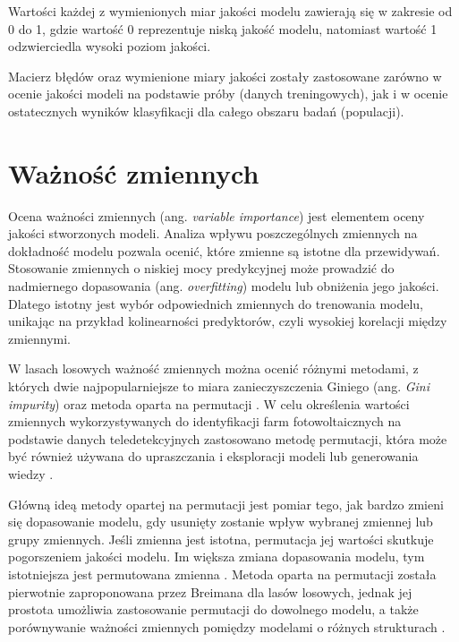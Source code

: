 \documentclass{amuthesis}
\begin{document}
Wartości każdej z wymienionych miar jakości modelu zawierają się w
zakresie od 0 do 1, gdzie wartość 0 reprezentuje niską jakość modelu,
natomiast wartość 1 odzwierciedla wysoki poziom jakości.

Macierz błędów oraz wymienione miary jakości zostały zastosowane zarówno
w ocenie jakości modeli na podstawie próby (danych treningowych), jak i
w ocenie ostatecznych wyników klasyfikacji dla całego obszaru badań
(populacji).

\hypertarget{sec-variable-importance}{%
\section{Ważność zmiennych}\label{sec-variable-importance}}

Ocena ważności zmiennych (ang. \emph{variable importance}) jest
elementem oceny jakości stworzonych modeli. Analiza wpływu
poszczególnych zmiennych na dokładność modelu pozwala ocenić, które
zmienne są istotne dla przewidywań. Stosowanie zmiennych o niskiej mocy
predykcyjnej może prowadzić do nadmiernego dopasowania (ang.
\emph{overfitting}) modelu lub obniżenia jego jakości. Dlatego istotny
jest wybór odpowiednich zmiennych do trenowania modelu, unikając na
przykład kolinearności predyktorów, czyli wysokiej korelacji między
zmiennymi.

W lasach losowych ważność zmiennych można ocenić różnymi metodami, z
których dwie najpopularniejsze to miara zanieczyszczenia Giniego (ang.
\emph{Gini impurity}) oraz metoda oparta na permutacji
\autocite{biecek_2017_przewodnik}. W celu określenia wartości zmiennych
wykorzystywanych do identyfikacji farm fotowoltaicznych na podstawie
danych teledetekcyjnych zastosowano metodę permutacji, która może być
również używana do upraszczania i eksploracji modeli lub generowania
wiedzy \autocite{biecek_2021_model_analysis}.

Główną ideą metody opartej na permutacji jest pomiar tego, jak bardzo
zmieni się dopasowanie modelu, gdy usunięty zostanie wpływ wybranej
zmiennej lub grupy zmiennych. Jeśli zmienna jest istotna, permutacja jej
wartości skutkuje pogorszeniem jakości modelu. Im większa zmiana
dopasowania modelu, tym istotniejsza jest permutowana zmienna
\autocite{biecek_2021_model_analysis}. Metoda oparta na permutacji
została pierwotnie zaproponowana przez Breimana
\autocite*{breiman_2001_rf} dla lasów losowych, jednak jej prostota
umożliwia zastosowanie permutacji do dowolnego modelu, a także
porównywanie ważności zmiennych pomiędzy modelami o różnych strukturach
\autocite{biecek_2021_model_analysis}.
\end{document}

